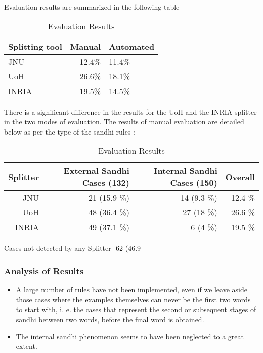 \documentclass[11pt]{article}
\begin{document}
Evaluation results are summarized in the following table

\begin{table}[h]
\begin{center}
\begin{tabular}{|l|rl|}
\hline \bf Splitting tool & \bf Manual \bf & Automated \\ \hline
JNU&12.4\%&11.4\% \\
UoH&26.6\%&18.1\% \\
INRIA&19.5\%&14.5\% \\
\hline
\end{tabular}
\end{center}
\caption{\label{font-table} Evaluation Results }
\end{table}

There is a significant difference in the results for the UoH and the INRIA splitter in the two modes of evaluation. The results of manual evaluation are detailed below as per the type of the sandhi rules :

\begin{table}[h]
\begin{center}
\begin{tabular}{|r| r| r| r| }
\hline \bf Splitter & \bf External Sandhi Cases (132) & \bf Internal Sandhi Cases (150) & \bf Overall \\
\hline
JNU &  21 (15.9 \%) & 14 (9.3 \%) & 12.4 \%  \\
 UoH & 48 (36.4 \%) & 27 (18 \%) & 26.6 \% \\
INRIA  &  49 (37.1 \%) &  6 (4 \%) & 19.5 \% \\
\hline
\end{tabular}
\end{center}
\caption{\label{font-table} Evaluation Results }
\end{table}

Cases not detected by any Splitter- 62 (46.9 %




\subsubsection{Analysis of Results}
\begin{itemize}
\item   A large number of rules have not been implemented, even if we leave aside those cases where the examples themselves can never be the first two words to start with, i. e. the cases that represent the second or subsequent stages of sandhi between two words, before the final word is obtained.
\item The internal sandhi phenomenon seems to have been neglected to a great extent. 
\end{itemize}
\end{document}
